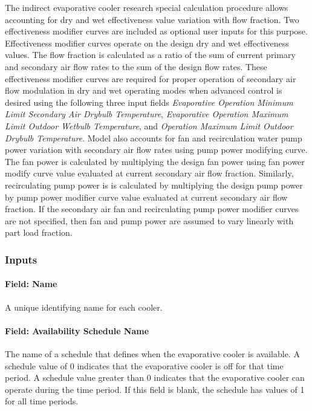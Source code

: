The indirect evaporative cooler research special calculation procedure allows accounting for dry and wet effectiveness value variation with flow fraction. Two effectiveness modifier curves are included as optional user inputs for this purpose. Effectiveness modifier curves operate on the design dry and wet effectiveness values. The flow fraction is calculated as a ratio of the sum of current primary and secondary air flow rates to the sum of the design flow rates. These effectiveness modifier curves are required for proper operation of secondary air flow modulation in dry and wet operating modes when advanced control is desired using the following three input fields \textit{Evaporative Operation Minimum Limit Secondary Air Drybulb Temperature}, \textit{Evaporative Operation Maximum Limit Outdoor Wetbulb Temperature}, and \textit{Operation Maximum Limit Outdoor Drybulb Temperature}. Model also accounts for fan and recirculation water pump power variation with secondary air flow rates using pump power modifying curve. The fan power is calculated by multiplying the design fan power using fan power modify curve value evaluated at current secondary air flow fraction. Similarly, recirculating pump power is is calculated by multiplying the design pump power by pump power modifier curve value evaluated at current secondary air flow fraction. If the secondary air fan and recirculating pump power modifier curves are not specified, then fan and pump power are assumed to vary linearly with part load fraction.

\subsubsection{Inputs}\label{inputs-4-011}

\paragraph{Field: Name}\label{field-name-4-010}

A unique identifying name for each cooler.

\paragraph{Field: Availability Schedule Name}\label{field-availability-schedule-name-1-004}

The name of a schedule that defines when the evaporative cooler is available. A schedule value of 0 indicates that the evaporative cooler is off for that time period. A schedule value greater than 0 indicates that the evaporative cooler can operate during the time period. If this field is blank, the schedule has values of 1 for all time periods.

